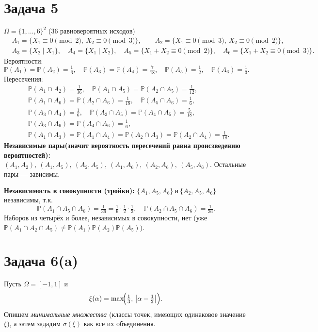 \documentclass[12pt]{article}
\newcommand{\PP}{\mathbb{P}}
\begin{document}
    \section*{Задача 5}
    $\Omega=\{1,\dots,6\}^2$ (36 равновероятных исходов)
    \begin{align*}
        &A_1=\{X_1\equiv0\!\!\!\pmod2,\ X_2\equiv0\!\!\!\pmod3\},\qquad
        A_2=\{X_1\equiv0\!\!\!\pmod3,\ X_2\equiv0\!\!\!\pmod2\},\\
        &A_3=\{X_2\mid X_1\},\quad A_4=\{X_1\mid X_2\},\quad
        A_5=\{X_1+X_2\equiv0\!\!\!\pmod2\},\quad
        A_6=\{X_1+X_2\equiv0\!\!\!\pmod3\}.
    \end{align*}
    Вероятности:
    \[
        \PP(A_1)=\PP(A_2)=\tfrac16,\quad \PP(A_3)=\PP(A_4)=\tfrac{7}{18},\quad
        \PP(A_5)=\tfrac12,\quad \PP(A_6)=\tfrac13.
    \]
    Пересечения:
    \begin{align*}
        &\PP(A_1\cap A_2)=\tfrac{1}{36},\quad
        \PP(A_1\cap A_5)=\PP(A_2\cap A_5)=\tfrac{1}{12},\\
        &\PP(A_1\cap A_6)=\PP(A_2\cap A_6)=\tfrac{1}{18},\quad
        \PP(A_5\cap A_6)=\tfrac{1}{6},\\
        &\PP(A_3\cap A_4)=\tfrac{1}{6},\quad
        \PP(A_3\cap A_5)=\PP(A_4\cap A_5)=\tfrac{5}{18},\\
        &\PP(A_3\cap A_6)=\PP(A_4\cap A_6)=\tfrac{1}{6},\\
        &\PP(A_1\cap A_3)=\PP(A_1\cap A_4)=\PP(A_2\cap A_3)=\PP(A_2\cap A_4)=\tfrac{1}{18}.
    \end{align*}
    \textbf{Независимые пары(значит вероятность пересечений равна происзведению вероятностей):}
    \(
    (A_1,A_2),\ (A_1,A_5),\ (A_2,A_5),\ (A_1,A_6),\ (A_2,A_6),\ (A_5,A_6).
    \)
    Остальные пары — зависимы.

    \textbf{Независимость в совокупности (тройки):}
    \(
    \{A_1,A_5,A_6\}\ \text{и}\ \{A_2,A_5,A_6\}
    \)
    независимы, т.к.
    \[
        \PP(A_1\cap A_5\cap A_6)=\tfrac{1}{36}=\tfrac16\cdot\tfrac12\cdot\tfrac13,
        \quad
        \PP(A_2\cap A_5\cap A_6)=\tfrac{1}{36}.
    \]
    Наборов из четырёх и более, независимых в совокупности, нет (уже
    $\PP(A_1\cap A_2\cap A_5)\ne \PP(A_1)\PP(A_2)\PP(A_5)$).


    \section*{Задача 6(a)}
    Пусть $\Omega=[-1,1]$ и
    \[
        \xi(\alpha)=\max\!\Bigl(\tfrac{1}{3},\,\bigl|\alpha-\tfrac{1}{2}\bigr|\Bigr).
    \]
    Опишем \emph{минимальные множества} (классы точек, имеющих одинаковое значение $\xi$), а затем зададим
    $\sigma(\xi)$ как все их объединения.
\end{document}
